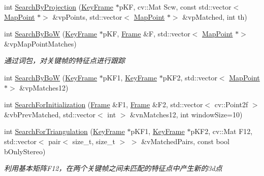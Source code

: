 \begin{DoxyCompactItemize}
\item 
int \mbox{\hyperlink{class_o_r_b___s_l_a_m2_1_1_o_r_bmatcher_ac1c0dcdeed922c9a96760aa9a76a2fdb}{Search\+By\+Projection}} (\mbox{\hyperlink{class_o_r_b___s_l_a_m2_1_1_key_frame}{Key\+Frame}} $\ast$p\+KF, cv\+::\+Mat Scw, const std\+::vector$<$ \mbox{\hyperlink{class_o_r_b___s_l_a_m2_1_1_map_point}{Map\+Point}} $\ast$$>$ \&vp\+Points, std\+::vector$<$ \mbox{\hyperlink{class_o_r_b___s_l_a_m2_1_1_map_point}{Map\+Point}} $\ast$$>$ \&vp\+Matched, int th)
\item 
int \mbox{\hyperlink{class_o_r_b___s_l_a_m2_1_1_o_r_bmatcher_a024fe40fa89785df914ef0a59cdf605d}{Search\+By\+BoW}} (\mbox{\hyperlink{class_o_r_b___s_l_a_m2_1_1_key_frame}{Key\+Frame}} $\ast$p\+KF, \mbox{\hyperlink{class_o_r_b___s_l_a_m2_1_1_frame}{Frame}} \&F, std\+::vector$<$ \mbox{\hyperlink{class_o_r_b___s_l_a_m2_1_1_map_point}{Map\+Point}} $\ast$$>$ \&vp\+Map\+Point\+Matches)
\begin{DoxyCompactList}\small\item\em 通过词包，对关键帧的特征点进行跟踪 \end{DoxyCompactList}\item 
int \mbox{\hyperlink{class_o_r_b___s_l_a_m2_1_1_o_r_bmatcher_ad62ee37a7d926719f16ddd17f7e48e10}{Search\+By\+BoW}} (\mbox{\hyperlink{class_o_r_b___s_l_a_m2_1_1_key_frame}{Key\+Frame}} $\ast$p\+K\+F1, \mbox{\hyperlink{class_o_r_b___s_l_a_m2_1_1_key_frame}{Key\+Frame}} $\ast$p\+K\+F2, std\+::vector$<$ \mbox{\hyperlink{class_o_r_b___s_l_a_m2_1_1_map_point}{Map\+Point}} $\ast$$>$ \&vp\+Matches12)
\item 
int \mbox{\hyperlink{class_o_r_b___s_l_a_m2_1_1_o_r_bmatcher_aff9b6dde7878d59e334ed5ad2ddd04eb}{Search\+For\+Initialization}} (\mbox{\hyperlink{class_o_r_b___s_l_a_m2_1_1_frame}{Frame}} \&F1, \mbox{\hyperlink{class_o_r_b___s_l_a_m2_1_1_frame}{Frame}} \&F2, std\+::vector$<$ cv\+::\+Point2f $>$ \&vb\+Prev\+Matched, std\+::vector$<$ int $>$ \&vn\+Matches12, int window\+Size=10)
\item 
int \mbox{\hyperlink{class_o_r_b___s_l_a_m2_1_1_o_r_bmatcher_a0ecb7f018e9184c67c4a48ad8616217d}{Search\+For\+Triangulation}} (\mbox{\hyperlink{class_o_r_b___s_l_a_m2_1_1_key_frame}{Key\+Frame}} $\ast$p\+K\+F1, \mbox{\hyperlink{class_o_r_b___s_l_a_m2_1_1_key_frame}{Key\+Frame}} $\ast$p\+K\+F2, cv\+::\+Mat F12, std\+::vector$<$ pair$<$ size\+\_\+t, size\+\_\+t $>$ $>$ \&v\+Matched\+Pairs, const bool b\+Only\+Stereo)
\begin{DoxyCompactList}\small\item\em 利用基本矩阵\+F12，在两个关键帧之间未匹配的特征点中产生新的3d点 \end{DoxyCompactList}\item 

\end{DoxyCompactItemize}
